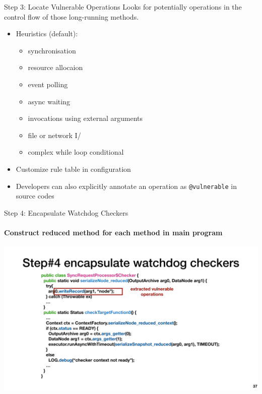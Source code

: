 \documentclass[aspectratio=169]{beamer}
\newcommand{\red}[1]{{\color{red}{#1}}}
\begin{document}
\begin{frame}{Step 3: Locate Vulnerable Operations}
    Looks for potentially \red{vulnerable} operations in the control flow of those long-running methods.

    \begin{itemize}
        \item Heuristics (default):
        \begin{itemize}
            \item synchronisation
            \item resource allocaion
            \item event polling
            \item async waiting
            \item invocations using external arguments
            \item file or network I/
            \item complex while loop conditional
        \end{itemize}
        \item Customize rule table in configuration
        \item Developers can also explicitly annotate an operation as \texttt{@vulnerable} in source codes
    \end{itemize}
\end{frame}

\begin{frame}{Step 4: Encapsulate Watchdog Checkers}
    \framesubtitle{Construct reduced method for each \red{vulnerable} method in main program}
    \begin{center}
        \includegraphics[width=.85\textwidth]{fig/encapsulate}
    \end{center}
\end{frame}
\end{document}
